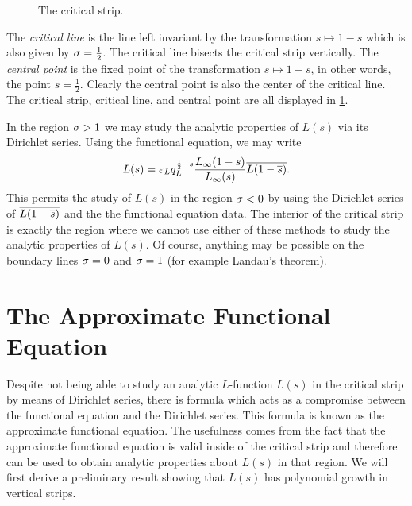 \documentclass[12pt]{article}
\begin{document}
    \begin{figure}[ht]
      \centering
      \caption{The critical strip.}
      \label{fig:critical_strip}
    \end{figure}

    The \textit{critical line} is the line left invariant by the transformation \(s \mapsto 1-s\) which is also given by \(\sigma = \frac{1}{2}\). The critical line bisects the critical strip vertically. The \textit{central point} is the fixed point of the transformation \(s \mapsto 1-s\), in other words, the point \(s = \frac{1}{2}\). Clearly the central point is also the center of the critical line. The critical strip, critical line, and central point are all displayed in \cref{fig:critical_strip}.

    In the region \(\sigma > 1\) we may study the analytic properties of \(L(s)\) via its Dirichlet series. Using the functional equation, we may write
    \[
      L(s) = \varepsilon_{L}q_{L}^{\frac{1}{2}-s}\frac{L_{\infty}(1-s)}{L_{\infty}(s)}\overline{L(1-\overline{s})}.
    \]
    This permits the study of \(L(s)\) in the region \(\sigma < 0\) by using the Dirichlet series of \(\overline{L(1-\overline{s})}\) and the the functional equation data. The interior of the critical strip is exactly the region where we cannot use either of these methods to study the analytic properties of \(L(s)\). Of course, anything may be possible on the boundary lines \(\sigma = 0\) and \(\sigma = 1\) (for example Landau's theorem).
  \section{The Approximate Functional Equation}
    Despite not being able to study an analytic \(L\)-function \(L(s)\) in the critical strip by means of Dirichlet series, there is formula which acts as a compromise between the functional equation and the Dirichlet series. This formula is known as the approximate functional equation. The usefulness comes from the fact that the approximate functional equation is valid inside of the critical strip and therefore can be used to obtain analytic properties about \(L(s)\) in that region. We will first derive a preliminary result showing that \(L(s)\) has polynomial growth in vertical strips.
\end{document}
